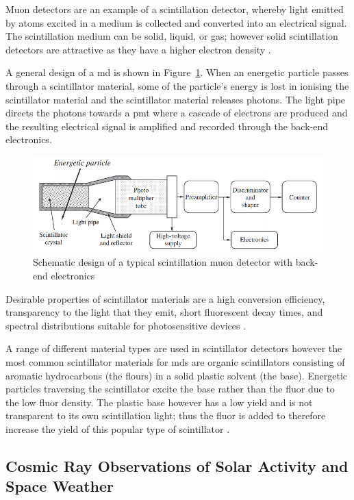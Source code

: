 Muon detectors are an example of a scintillation detector, whereby light emitted by atoms excited in a medium is collected and converted into an electrical signal. The scintillation medium can be solid, liquid, or gas; however solid scintillation detectors are attractive as they have a higher electron density \citep{gloeckler_-situ_2010}.

A general design of a \gls{md} is shown in Figure~\ref{fig:MD}. When an energetic particle passes through a scintillator material, some of the particle's energy is lost in ionising the scintillator material and the scintillator material releases photons. The light pipe directs the photons towards a \gls{pmt} where a cascade of electrons are produced and the resulting electrical signal is amplified and recorded through the back-end electronics.

\begin{figure}[ht]
	\centering
	\includegraphics[width=0.7\columnwidth]{scintillator_rescaled.png}
	\caption{Schematic design of a typical scintillation muon detector with back-end electronics \citep{gloeckler_-situ_2010}}
	\label{fig:MD}
\end{figure}

Desirable properties of scintillator materials are a high conversion efficiency, transparency to the light that they emit, short fluorescent decay times, and spectral distributions suitable for photosensitive devices \citep{gloeckler_-situ_2010}. 

A range of different material types are used in scintillator detectors however the most common scintillator materials for \glspl{md} are organic scintillators consisting of aromatic hydrocarbons (the flours) in a solid plastic solvent (the base). Energetic particles traversing the scintillator excite the base rather than the fluor due to the low fluor density. The plastic base however has a low yield and is not transparent to its own scintillation light; thus the fluor is added to therefore increase the yield of this popular type of scintillator \citep{fokkema_hisparc_2012}.





\subsection{Cosmic Ray Observations of Solar Activity and Space Weather}


